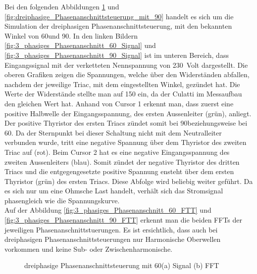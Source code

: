 Bei den folgenden Abbildungen \ref{fig:dreiphasige_Phasenanschnittsteuerung_mit_60} und \ref{fig:dreiphasige_Phasenanschnittsteuerung_mit_90} handelt es sich um die Simulation der dreiphasigen Phasenanschnittsteuerung, mit den bekannten Winkel von 60\textdegree  und 90\textdegree.
In den linken Bildern \ref{fig:3_phasiges_Phasenanschnitt_60_Signal} und \ref{fig:3_phasiges_Phasenanschnitt_90_Signal} ist im  unteren Bereich, dass Eingangssignal mit der verketteten Nennspannung von \SI{230}{Volt} dargestellt. Die oberen Grafiken zeigen die Spannungen, welche über den Widerständen abfallen, nachdem der jeweilige Triac, mit dem eingestellten Winkel, gezündet hat. Die Werte der Widerstände stellte man auf \SI{150}{\Omega} ein, da der Culatti im Messaufbau den gleichen Wert hat. Anhand von Cursor 1 erkennt man, dass zuerst eine positive Halbwelle der Eingangsspannung, des ersten Aussenleiter (grün), anliegt. Der positive Thyristor des ersten Triacs zündet somit bei 90\textdegree beziehungsweise bei 60\textdegree. Da der Sternpunkt bei dieser Schaltung nicht mit dem Neutralleiter verbunden wurde, tritt eine negative Spannung über dem Thyristor des zweiten Triac auf (rot). Beim Cursor 2 hat es eine negative Eingangsspannung des zweiten Aussenleiters (blau). Somit zündet der negative Thyristor des dritten Triacs und die entgegengesetzte positive Spannung ensteht über dem ersten Thyristor (grün) des ersten Triacs. Diese Abfolge wird beliebig weiter geführt. Da es sich nur um eine Ohmsche Last handelt, verhält sich das Stromsignal phasengleich wie die Spannungskurve. \\
Auf der Abbildung \ref{fig:3_phasiges_Phasenanschnitt_60_FTT} und \ref{fig:3_phasiges_Phasenanschnitt_90_FTT} erkennt man die beiden  FFTs der jeweiligen Phasenanschnittstuerungen. Es ist ersichtlich, dass auch bei dreiphasigen Phasenanschnittsteuerungen nur Harmonische Oberwellen vorkommen und keine Sub- oder Zwischenharmonische. 

\begin{figure}[ht!]
	\centering
	\qquad
	\caption{dreiphasige Phasenanschnittsteuerung mit 60\textdegree (a) Signal (b) FFT}
	\label{fig:dreiphasige_Phasenanschnittsteuerung_mit_60}
\end{figure}

 

